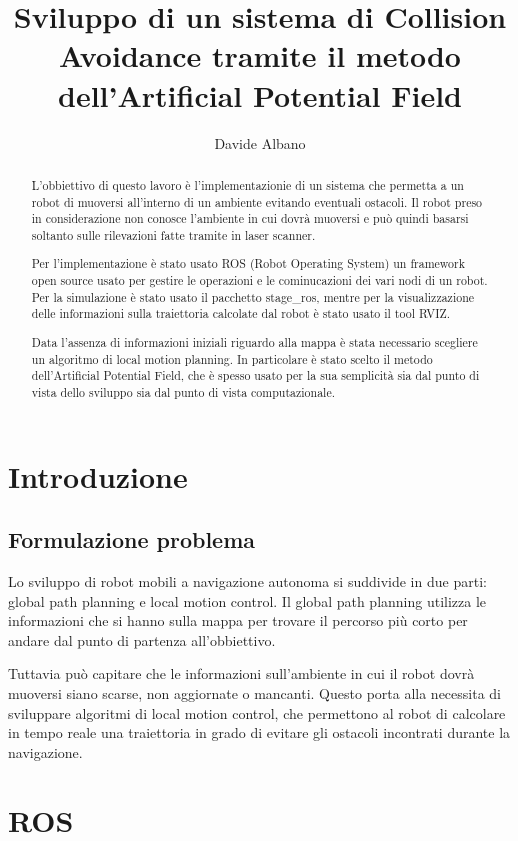 \documentclass[Lau, binding=0.6cm, twoside]{sapthesis}
\title{Sviluppo di un sistema di Collision Avoidance tramite il metodo dell'Artificial Potential Field}
\author{Davide Albano}
\begin{document}
\maketitle
\begin{abstract}
L'obbiettivo di questo lavoro è l'implementazionie di un sistema che permetta a un robot di muoversi all'interno di un ambiente evitando eventuali ostacoli.
Il robot preso in considerazione non conosce l'ambiente in cui dovrà muoversi e può quindi basarsi soltanto sulle rilevazioni fatte tramite in laser scanner.

Per l'implementazione è stato usato ROS (Robot Operating System) un framework open source usato per gestire le operazioni e le cominucazioni dei vari nodi di un robot.
Per la simulazione è stato usato il pacchetto stage\_ros, mentre per la visualizzazione delle informazioni sulla traiettoria calcolate dal robot è stato usato il tool RVIZ.

Data l'assenza di informazioni iniziali riguardo alla mappa è stata necessario scegliere un algoritmo di local motion planning.
In particolare è stato scelto il metodo dell'Artificial Potential Field, che è spesso usato per la sua semplicità sia dal punto di vista dello sviluppo sia dal punto di vista computazionale.
\end{abstract}
\tableofcontents

\chapter{Introduzione}
\section{Formulazione problema}
Lo sviluppo di robot mobili a navigazione autonoma si suddivide in due parti: global path planning e local motion control.
Il global path planning utilizza le informazioni che si hanno sulla mappa per trovare il percorso più corto per andare dal punto di partenza all'obbiettivo.

Tuttavia può capitare che le informazioni sull'ambiente in cui il robot dovrà muoversi siano scarse, non aggiornate o mancanti.
Questo porta alla necessita di sviluppare algoritmi di local motion control, che permettono al robot di calcolare in tempo reale una traiettoria in grado di evitare gli ostacoli incontrati durante la navigazione.

\chapter{ROS}
\end{document}
